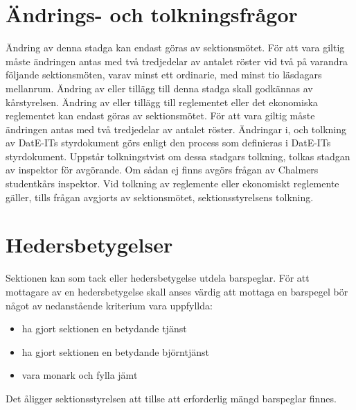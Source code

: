 \documentclass[a4paper]{dteklag}
\begin{document}
\section{Ändrings- och tolkningsfrågor}
\para[Stadgeändringar] Ändring av denna stadga kan endast göras av sektionsmötet. För att vara giltig måste ändringen antas med två tredjedelar av antalet röster vid två på varandra följande sektionsmöten, varav minst ett ordinarie, med minst tio läsdagars mellanrum.
\stycke Ändring av eller tillägg till denna stadga skall godkännas av kårstyrelsen.
\para[Reglementesändring] Ändring av eller tillägg till reglementet eller det ekonomiska reglementet kan endast göras av sektionsmötet. För att vara giltig måste ändringen antas med två tredjedelar av antalet röster.
 Ändringar i, och tolkning av DatE-ITs styrdokument görs enligt den process som definieras i DatE-ITs styrdokument.
\para[Tolkningstvist] Uppstår tolkningstvist om dessa stadgars tolkning, tolkas stadgan av inspektor för avgörande. Om sådan ej finns avgörs frågan av Chalmers studentkårs inspektor.
\stycke Vid tolkning av reglemente eller ekonomiskt reglemente gäller, tills frågan avgjorts av sektionsmötet, sektionsstyrelsens tolkning.

\section{Hedersbetygelser}
\para Sektionen kan som tack eller hedersbetygelse utdela barspeglar.
\para För att mottagare av en hedersbetygelse skall anses värdig att mottaga en barspegel bör något av nedanstående kriterium vara uppfyllda:
\begin{itemize}
\item ha gjort sektionen en betydande tjänst
\item ha gjort sektionen en betydande björntjänst
\item vara monark och fylla jämt
\end{itemize}
\para Det åligger sektionsstyrelsen att tillse att erforderlig mängd barspeglar finnes.
\end{document}

